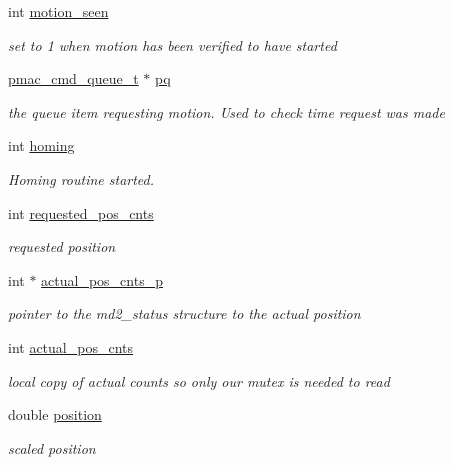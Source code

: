 \begin{DoxyCompactItemize}
int \hyperlink{structlspmac__motor__struct_a68c471836f52707fa8582f7860cf500f}{motion\-\_\-seen}
\begin{DoxyCompactList}\small\item\em set to 1 when motion has been verified to have started \end{DoxyCompactList}\item 
\hyperlink{pgpmac_8h_a99c275e32ad897dca34d196b91f038cb}{pmac\-\_\-cmd\-\_\-queue\-\_\-t} $\ast$ \hyperlink{structlspmac__motor__struct_a8caf0031e134e144bffc87d9d896d15b}{pq}
\begin{DoxyCompactList}\small\item\em the queue item requesting motion. Used to check time request was made \end{DoxyCompactList}\item 
int \hyperlink{structlspmac__motor__struct_aa74108855693f94fc2ff76333c9fb6ac}{homing}
\begin{DoxyCompactList}\small\item\em Homing routine started. \end{DoxyCompactList}\item 
int \hyperlink{structlspmac__motor__struct_a6e8dc9c11dc52a439fe9837230f93ce2}{requested\-\_\-pos\-\_\-cnts}
\begin{DoxyCompactList}\small\item\em requested position \end{DoxyCompactList}\item 
int $\ast$ \hyperlink{structlspmac__motor__struct_a312047bb71def5cd2443fecd875eaea5}{actual\-\_\-pos\-\_\-cnts\-\_\-p}
\begin{DoxyCompactList}\small\item\em pointer to the md2\-\_\-status structure to the actual position \end{DoxyCompactList}\item 
int \hyperlink{structlspmac__motor__struct_ae5c7aea45b9637a1817be246688fd980}{actual\-\_\-pos\-\_\-cnts}
\begin{DoxyCompactList}\small\item\em local copy of actual counts so only our mutex is needed to read \end{DoxyCompactList}\item 
double \hyperlink{structlspmac__motor__struct_af8ffb3aed907d8664b65b37601954411}{position}
\begin{DoxyCompactList}\small\item\em scaled position \end{DoxyCompactList}\item 

\end{DoxyCompactItemize}

